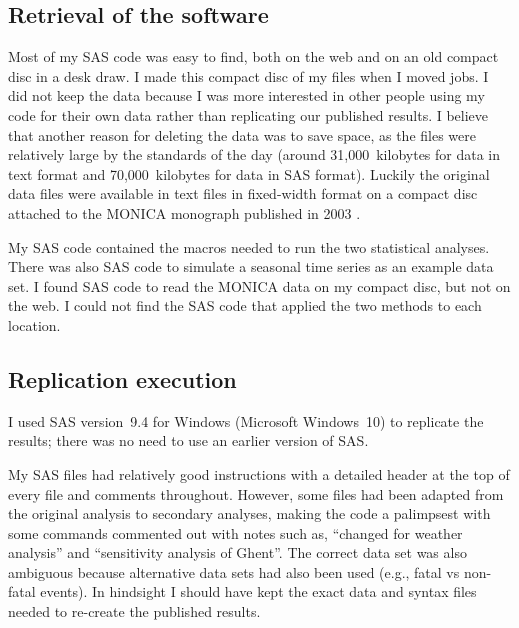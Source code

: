 \subsection{Retrieval of the software}

Most of my SAS code was easy to find, both on the web and on an old compact disc in a desk draw. I made this compact disc of my files when I moved jobs. I did not keep the data because I was more interested in other people using my code for their own data rather than replicating our published results. I believe that another reason for deleting the data was to save space, as the files were relatively large by the standards of the day (around 31,000~kilobytes for data in text format and 70,000~kilobytes for data in SAS format). Luckily the original data files were available in text files in fixed-width format on a compact disc attached to the MONICA monograph published in 2003 \supercite{Tunstall2003}.

My SAS code contained the macros needed to run the two statistical analyses. There was also SAS code to simulate a seasonal time series as an example data set. I found SAS code to read the MONICA data on my compact disc, but not on the web. I could not find the SAS code that applied the two methods to each location.


\subsection{Replication execution}

I used SAS version~9.4 for Windows (Microsoft Windows~10) to replicate the results; there was no need to use an earlier version of SAS. 

My SAS files had relatively good instructions with a detailed header at the top of every file and comments throughout. However, some files had been adapted from the original analysis to secondary analyses, making the code a palimpsest with some commands commented out with notes such as, ``changed for weather analysis'' and ``sensitivity analysis of Ghent''. The correct data set was also ambiguous because alternative data sets had also been used (e.g., fatal vs non-fatal events).  In hindsight I should have kept the exact data and syntax files needed to re-create the published results.

